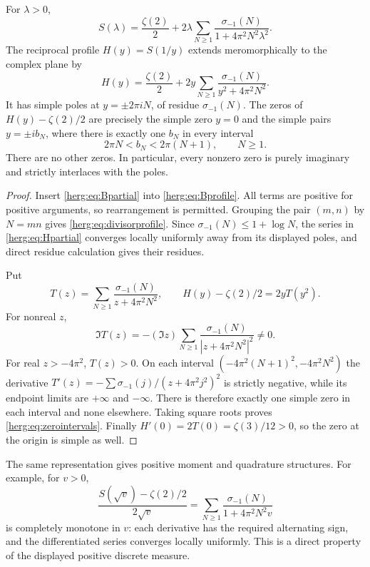 \begin{theorem}
\label{herg:thm:profilezeros}
For $\lambda>0$,
\begin{equation}\label{herg:eq:divisorprofile}
 S(\lambda)=\frac{\zeta(2)}2+
       2\lambda\sum_{N\geq1}
              \frac{\sigma_{-1}(N)}{1+4\pi^2N^2\lambda^2}.
\end{equation}
The reciprocal profile $H(y)=S(1/y)$ extends meromorphically to
the complex plane by
\begin{equation}\label{herg:eq:Hpartial}
 H(y)=\frac{\zeta(2)}2+
           2y\sum_{N\geq1}
                       \frac{\sigma_{-1}(N)}{y^2+4\pi^2N^2}.
\end{equation}
It has simple poles at $y=\pm2\pi iN$, of residue
$\sigma_{-1}(N)$. The zeros of $H(y)-\zeta(2)/2$ are precisely
the simple zero $y=0$ and the simple pairs $y=\pm i b_N$, where
there is exactly one $b_N$ in every interval
\begin{equation}\label{herg:eq:zerointervals}
 2\pi N<b_N<2\pi(N+1),\qquad N\geq1.
\end{equation}
There are no other zeros. In particular, every nonzero zero is
purely imaginary and strictly interlaces with the poles.
\end{theorem}
\begin{proof}
Insert \eqref{herg:eq:Bpartial} into \eqref{herg:eq:Bprofile}.
All terms are positive for positive arguments, so rearrangement is
permitted. Grouping the pair $(m,n)$ by $N=mn$ gives
\eqref{herg:eq:divisorprofile}. Since
$\sigma_{-1}(N)\leq1+\log N$, the series in
\eqref{herg:eq:Hpartial} converges locally uniformly away from its
displayed poles, and direct residue calculation gives their residues.

Put
\[
 T(z)=\sum_{N\geq1}\frac{\sigma_{-1}(N)}{z+4\pi^2N^2},
 \qquad H(y)-\zeta(2)/2=2yT(y^2).
\]
For nonreal $z$,
\[
 \Im T(z)=-(\Im z)\sum_{N\geq1}
             \frac{\sigma_{-1}(N)}{|z+4\pi^2N^2|^2}\ne0.
\]
For real $z>-4\pi^2$, $T(z)>0$. On each interval
$(-4\pi^2(N+1)^2,-4\pi^2N^2)$ the derivative
$T'(z)=-\sum\sigma_{-1}(j)/(z+4\pi^2j^2)^2$ is strictly
negative, while its endpoint limits are $+\infty$ and $-\infty$.
There is therefore exactly one simple zero in each interval and
none elsewhere. Taking square roots proves \eqref{herg:eq:zerointervals}.
Finally $H'(0)=2T(0)=\zeta(3)/12>0$, so the zero at the origin
is simple as well.
\end{proof}

The same representation gives positive moment and quadrature
structures. For example, for $v>0$,
\[
 \frac{S(\sqrt v)-\zeta(2)/2}{2\sqrt v}
 =\sum_{N\geq1}\frac{\sigma_{-1}(N)}{1+4\pi^2N^2v}
\]
is completely monotone in $v$: each derivative has the required
alternating sign, and the differentiated series converges locally
uniformly. This is a direct property of the displayed positive
discrete measure.

